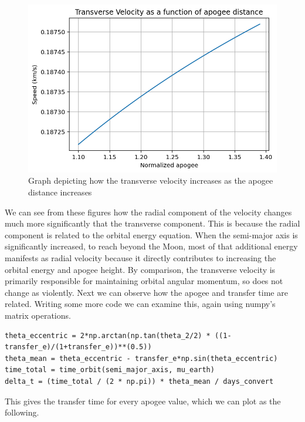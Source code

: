\documentclass[12pt,twocolumn]{article}  %
\begin{document}
\begin{figure}[H]
\begin{minipage}{0.48\textwidth}
    \end{minipage}
    \hfill
    \begin{minipage}{0.48\textwidth}
        \centering
        \includegraphics[width=\textwidth]{Images/221-trans.png}
        \caption{Graph depicting how the transverse velocity increases as the apogee distance increases}
    \end{minipage}
\end{figure}

We can see from these figures how the radial component of the velocity 
changes much more significantly that the transverse component.
This is because the radial component is related
 to the orbital energy equation. When the 
semi-major axis is significantly increased, 
to reach beyond the Moon, most of that additional energy 
manifests as radial velocity because it 
directly contributes to increasing the orbital energy and apogee height.
By comparison, the transverse velocity is primarily responsible 
for maintaining orbital angular momentum, so does not change as violently.
\newline
\newline
Next we can observe how the apogee and transfer time are related.
Writing some more code we can examine this, again using numpy's matrix operations.
\begin{lstlisting}
theta_eccentric = 2*np.arctan(np.tan(theta_2/2) * ((1-transfer_e)/(1+transfer_e))**(0.5))
theta_mean = theta_eccentric - transfer_e*np.sin(theta_eccentric)
time_total = time_orbit(semi_major_axis, mu_earth)
delta_t = (time_total / (2 * np.pi)) * theta_mean / days_convert
\end{lstlisting}

This gives the transfer time for every apogee value, which we can plot as the following.
\end{document}
